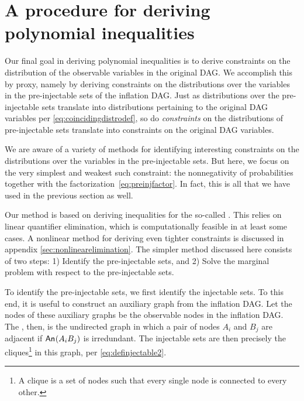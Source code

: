 {


\section{A procedure for deriving polynomial inequalities}
\label{sec:ineqs}


Our final goal in deriving polynomial inequalities is to derive constraints on the distribution of the observable variables in the original DAG. We accomplish this by proxy, namely by deriving constraints on the distributions over the variables in the pre-injectable sets of the inflation DAG. Just as distributions over the pre-injectable sets translate into distributions pertaining to the original DAG variables per \cref{eq:coincidingdistrodef}, so do \emph{constraints} on the distributions of pre-injectable sets translate into constraints on the original DAG variables.

We are aware of a variety of methods for identifying interesting constraints on the distributions over the variables in the pre-injectable sets. But here, we focus on the very simplest and weakest such constraint: the nonnegativity of probabilities together with the factorization~\cref{eq:preinjfactor}. In fact, this is all that we have used in the previous section as well.

Our method is based on deriving inequalities for the so-called . This relies on linear quantifier elimination, which is computationally feasible in at least some cases. A nonlinear method for deriving even tighter constraints is discussed in appendix \cref{sec:nonlinearelimination}. The simpler method discussed here consists of two steps: 1) Identify the pre-injectable sets, and 2) Solve the marginal problem with respect to the pre-injectable sets.


\label{step:findpreinjectable}\par\smallskip\nobreak

To identify the pre-injectable sets, we first identify the injectable sets. To this end, it is useful to construct an auxiliary graph from the inflation DAG. Let the nodes of these auxiliary graphs be the observable nodes in the inflation DAG. The , then, is the undirected graph in which a pair of nodes $A_i$ and $B_j$ are adjacent if  ${\mathsf{An}_{}}\lparen A_i B_j\rparen$ is irredundant. The injectable sets are then precisely the cliques\footnote{A clique is a set of nodes such that every single node is connected to every other.} in this graph, per \cref{eq:definjectable2}. 

}
